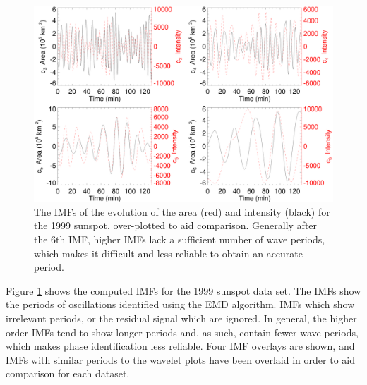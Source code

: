 	
	\begin{figure}
	\centering
	\includegraphics[width=\textwidth]{1999_IMFs.eps}
    \caption{
	      	The IMFs of the evolution of the area (red) and intensity (black) for the 1999 sunspot, over-plotted to aid comparison.
	      	Generally after the $6$th IMF, higher IMFs lack a sufficient number of wave periods, which makes it difficult and less reliable to obtain an accurate period.
   		    }
    \label{1999IMF}
	\end{figure}
		
	Figure \ref{1999IMF} shows the computed IMFs for the 1999 sunspot data set.
	The IMFs show the periods of oscillations identified using the EMD algorithm.
	IMFs which show irrelevant periods, or the residual signal which are ignored.
	In general, the higher order IMFs tend to show longer periods and, as such, contain fewer wave periods, which makes phase identification less reliable.
	Four IMF overlays are shown, and IMFs with similar periods to the wavelet plots have been overlaid in order to aid comparison for each dataset.
	

